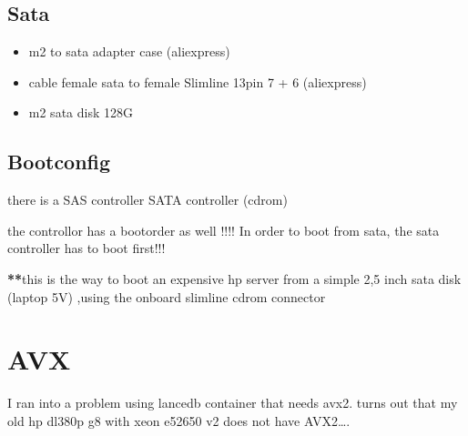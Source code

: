 \documentclass[letterpaper,10pt,english]{sphinxmanual}
\begin{document}
\section{Sata}
\label{\detokenize{hpdl380p:sata}}\begin{itemize}
\item {} 
\sphinxAtStartPar
m2 to sata adapter case (aliexpress)

\item {} 
\sphinxAtStartPar
cable female sata to female Slimline 13pin 7 + 6 (aliexpress)

\item {} 
\sphinxAtStartPar
m2 sata disk 128G

\end{itemize}


\section{Bootconfig}
\label{\detokenize{hpdl380p:bootconfig}}
\sphinxAtStartPar
there is a
\sphinxhyphen{} SAS controller
\sphinxhyphen{} SATA controller (cdrom)

\sphinxAtStartPar
the controllor has a bootorder as well !!!!
In order to boot from sata, the sata controller has to boot first!!!

\sphinxAtStartPar
{\color{red}\bfseries{}**}this is the way to boot an expensive hp server from a simple 2,5 inch sata disk (laptop 5V) ,using the onboard slimline cd\sphinxhyphen{}rom connector

\sphinxstepscope


\chapter{AVX}
\label{\detokenize{avx:avx}}\label{\detokenize{avx::doc}}
\sphinxAtStartPar
{}

\sphinxAtStartPar
I ran into a problem using lancedb container that needs avx2.
turns out that my old hp dl380p g8 with xeon e5\sphinxhyphen{}2650 v2 does not have AVX2….
\end{document}
